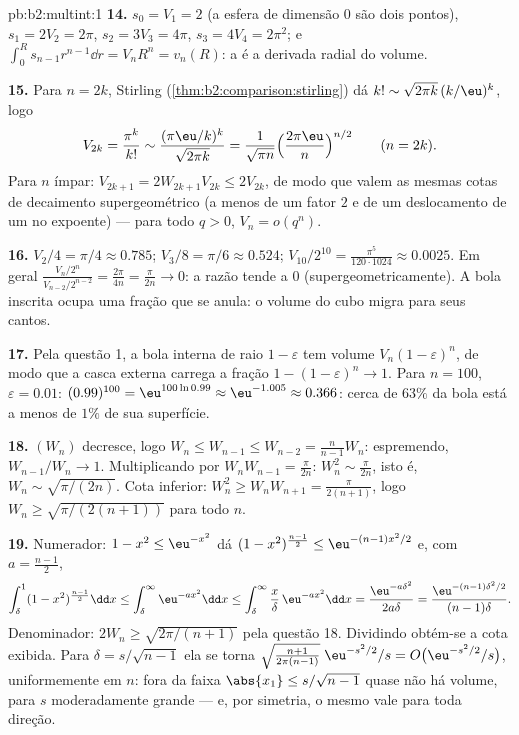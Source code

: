 \begin{solution}{pb:b2:multint:1}
\textbf{14.} $s_0 = V_1 = 2$ (a esfera de dimensão $0$ são dois pontos),
$s_1 = 2V_2 = 2\pi$, $s_2 = 3V_3 = 4\pi$, $s_3 = 4V_4 =
2\pi^2$; e $\int_0^R s_{n-1}r^{n-1}\dd r = V_nR^n =
v_n(R)$: a  é a derivada radial do volume.

\textbf{15.} Para $n = 2k$, Stirling
(\cref{thm:b2:comparison:stirling}) dá $k! \sim
\sqrt{2\pi k}\,(k/\eu)^k$, logo
\[
V_{2k} = \frac{\pi^k}{k!}
\sim \frac{(\pi\eu/k)^k}{\sqrt{2\pi k}}
= \frac1{\sqrt{\pi n}}\Bigl(\frac{2\pi\eu}n\Bigr)^{n/2}
\qquad (n = 2k).
\]
Para $n$ ímpar: $V_{2k+1} = 2W_{2k+1}V_{2k} \leq 2V_{2k}$, de modo que
valem as mesmas cotas de decaimento supergeométrico (a menos de um fator
$2$ e de um deslocamento de um no expoente) --- para todo $q >
0$, $V_n = o(q^n)$.

\textbf{16.} $V_2/4 = \pi/4 \approx 0.785$; $V_3/8 = \pi/6
\approx 0.524$; $V_{10}/2^{10} = \frac{\pi^5}{120\cdot1024}
\approx 0.0025$. Em geral $\frac{V_n/2^n}{V_{n-2}/2^{n-2}}
= \frac{2\pi}{4n} = \frac{\pi}{2n} \to 0$: a razão tende a
$0$ (supergeometricamente). A bola inscrita ocupa uma
fração que se anula: o volume do cubo migra para seus
cantos.

\textbf{17.} Pela questão 1, a bola interna de raio $1 -
\varepsilon$ tem volume $V_n(1-\varepsilon)^n$, de modo que a
casca externa carrega a fração $1 - (1 - \varepsilon)^n \to 1$.
Para $n = 100$, $\varepsilon = 0.01$: $(0.99)^{100} =
\eu^{100\ln0.99} \approx \eu^{-1.005} \approx 0.366$: cerca de
$63\%$ da bola está a menos de $1\%$ de sua superfície.

\textbf{18.} $(W_n)$ decresce, logo $W_n \leq W_{n-1} \leq
W_{n-2} = \frac{n}{n-1}W_n$: espremendo, $W_{n-1}/W_n \to 1$.
Multiplicando por $W_nW_{n-1} = \frac\pi{2n}$: $W_n^2 \sim
\frac\pi{2n}$, isto é, $W_n \sim \sqrt{\pi/(2n)}$. Cota inferior:
$W_n^2 \geq W_nW_{n+1} = \frac{\pi}{2(n+1)}$, logo $W_n \geq
\sqrt{\pi/(2(n+1))}$ para todo $n$.

\textbf{19.} Numerador: $1 - x^2 \leq \eu^{-x^2}$ dá $(1 -
x^2)^{\frac{n-1}2} \leq \eu^{-(n-1)x^2/2}$ e, com $a =
\frac{n-1}2$,
\[
\int_\delta^1(1 - x^2)^{\frac{n-1}2}\dd x
\leq \int_\delta^\infty\eu^{-ax^2}\dd x
\leq \int_\delta^\infty\frac x\delta\,\eu^{-ax^2}\dd x
= \frac{\eu^{-a\delta^2}}{2a\delta}
= \frac{\eu^{-(n-1)\delta^2/2}}{(n-1)\delta}.
\]
Denominador: $2W_n \geq \sqrt{2\pi/(n+1)}$ pela questão 18.
Dividindo obtém-se a cota exibida. Para $\delta =
s/\sqrt{n-1}$ ela se torna
$\sqrt{\tfrac{n+1}{2\pi(n-1)}}\;\eu^{-s^2/2}/s = O\bigl(
\eu^{-s^2/2}/s\bigr)$, uniformemente em $n$: fora da faixa
$\abs{x_1} \leq s/\sqrt{n-1}$ quase não há volume, para
$s$ moderadamente grande --- e, por simetria, o mesmo vale para
toda direção.


\end{solution}
